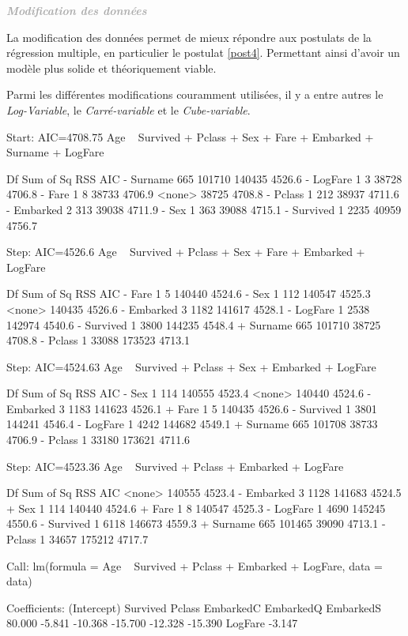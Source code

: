 \documentclass[11pt,french]{report}
\newenvironment{moreInfo}[1]
	{\begin{mdframed}
	\textcolor{darkgray}{\huge \raisebox{-3.5pt}{\faInfo} 
	\hspace{0.5cm} \large\bfseries #1}\\[5pt]
	\normalsize
	\makebox[0.1\textwidth][l]{}	
	\begin{minipage}{10cm}}
	{	\end{minipage}
	\end{mdframed}}
\begin{document}
\bigskip
\begin{moreInfo}{\color{Gray}\emph{Modification des données}
     \color{black}}
      La modification des données permet de mieux répondre aux postulats de la régression multiple, en particulier le postulat \ref{post4}. Permettant ainsi d'avoir un modèle plus solide et théoriquement viable. 
\bigskip

      Parmi les différentes modifications couramment utilisées, il y a entre autres le \emph{Log-Variable}, le \emph{Carré-variable} et le \emph{Cube-variable}.
\end{moreInfo}
\bigskip

\begin{Schunk}
\begin{Soutput}
Start:  AIC=4708.75
Age ~ Survived + Pclass + Sex + Fare + Embarked + Surname + LogFare

            Df Sum of Sq    RSS    AIC
- Surname  665    101710 140435 4526.6
- LogFare    1         3  38728 4706.8
- Fare       1         8  38733 4706.9
<none>                    38725 4708.8
- Pclass     1       212  38937 4711.6
- Embarked   2       313  39038 4711.9
- Sex        1       363  39088 4715.1
- Survived   1      2235  40959 4756.7

Step:  AIC=4526.6
Age ~ Survived + Pclass + Sex + Fare + Embarked + LogFare

            Df Sum of Sq    RSS    AIC
- Fare       1         5 140440 4524.6
- Sex        1       112 140547 4525.3
<none>                   140435 4526.6
- Embarked   3      1182 141617 4528.1
- LogFare    1      2538 142974 4540.6
- Survived   1      3800 144235 4548.4
+ Surname  665    101710  38725 4708.8
- Pclass     1     33088 173523 4713.1

Step:  AIC=4524.63
Age ~ Survived + Pclass + Sex + Embarked + LogFare

            Df Sum of Sq    RSS    AIC
- Sex        1       114 140555 4523.4
<none>                   140440 4524.6
- Embarked   3      1183 141623 4526.1
+ Fare       1         5 140435 4526.6
- Survived   1      3801 144241 4546.4
- LogFare    1      4242 144682 4549.1
+ Surname  665    101708  38733 4706.9
- Pclass     1     33180 173621 4711.6

Step:  AIC=4523.36
Age ~ Survived + Pclass + Embarked + LogFare

            Df Sum of Sq    RSS    AIC
<none>                   140555 4523.4
- Embarked   3      1128 141683 4524.5
+ Sex        1       114 140440 4524.6
+ Fare       1         8 140547 4525.3
- LogFare    1      4690 145245 4550.6
- Survived   1      6118 146673 4559.3
+ Surname  665    101465  39090 4713.1
- Pclass     1     34657 175212 4717.7
\end{Soutput}
\begin{Soutput}
Call:
lm(formula = Age ~ Survived + Pclass + Embarked + LogFare, data = data)

Coefficients:
(Intercept)     Survived       Pclass    EmbarkedC    EmbarkedQ    EmbarkedS  
     80.000       -5.841      -10.368      -15.700      -12.328      -15.390  
    LogFare  
     -3.147  
\end{Soutput}
\end{Schunk}
\end{document}
